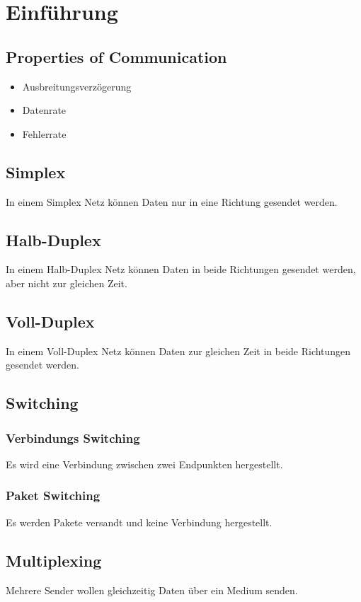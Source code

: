 \chapter{Einführung}
	\section{Properties of Communication} %
		\begin{itemize}
			\item Ausbreitungsverzögerung
			\item Datenrate
			\item Fehlerrate
		\end{itemize}

	\section{Simplex}
		In einem Simplex Netz können Daten nur in eine Richtung gesendet werden.

	\section{Halb-Duplex}
		In einem Halb-Duplex Netz können Daten in beide Richtungen gesendet werden, aber nicht zur gleichen Zeit.

	\section{Voll-Duplex}
		In einem Voll-Duplex Netz können Daten zur gleichen Zeit in beide Richtungen gesendet werden.

	\section{Switching}
		\subsection{Verbindungs Switching}
			Es wird eine Verbindung zwischen zwei Endpunkten hergestellt.

		\subsection{Paket Switching}
			Es werden Pakete versandt und keine Verbindung hergestellt.

	\section{Multiplexing}
		Mehrere Sender wollen gleichzeitig Daten über ein Medium senden.

